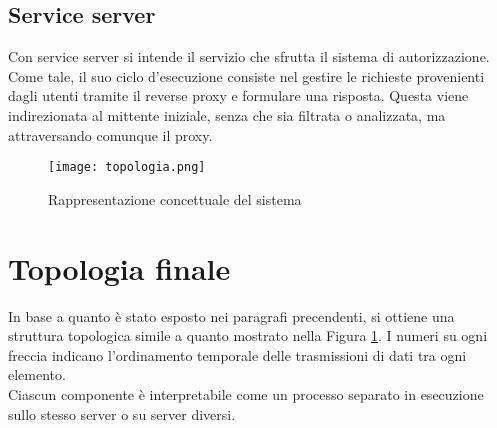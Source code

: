 \subsection{Service server} \label{serv_server}
Con service server si intende il servizio che sfrutta il sistema di autorizzazione. Come tale, il suo ciclo d'esecuzione consiste nel gestire 
le richieste provenienti dagli utenti tramite
 il reverse proxy e formulare una risposta.
Questa viene indirezionata al mittente iniziale, senza che sia filtrata o analizzata, ma attraversando comunque il proxy.

\begin{figure}[h]
    \texttt{[image: topologia.png]}
    \centering
    \caption{Rappresentazione concettuale del sistema}
    \label{topologia}
\end{figure}

\section{Topologia finale}
In base a quanto è stato esposto nei paragrafi precendenti, si ottiene una struttura topologica simile a quanto mostrato nella Figura \ref{topologia}. 
I numeri su ogni freccia indicano l'ordinamento temporale delle trasmissioni di dati tra ogni elemento. 
\\Ciascun componente è interpretabile come un processo separato in esecuzione sullo stesso server o su server diversi. 
